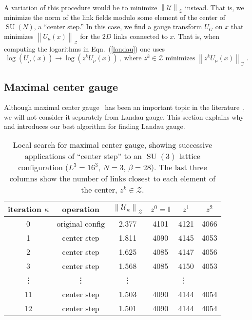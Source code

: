 \documentclass[preprint,aps,prd]{revtex4-2}
\newcommand{\be}{\begin{equation}}
\newcommand{\eq}{\end{equation}}
\newcommand{\zentrum}{\mathcal{Z}}       %
\newcommand{\config}{\mathcal{U}}
\DeclareMathOperator{\SU}{SU}
\newcommand\fnorm[1]{\left\lVert #1 \right\rVert_\mathrm{F}}
\newcommand\znorm[1]{\left\lVert #1 \right\rVert_\zentrum}
\begin{document}
A variation of this procedure would be to minimize
$\znorm{\config}$ instead.
That is, we minimize the norm of the link
fields modulo some element of the center of $\SU(N)$, a ``center step.''
In this case, we find a gauge transform $U_G$ on $x$
that minimizes $\znorm{U_\mu(x)}$ for the $2D$
links connected to $x$.
That is, when computing the logarithms in Eqn.~(\ref{landau}) one uses
\be
\log\left(U_\mu(x)\right) \to \log\left(z^k U_\mu(x)\right)
\, , \;\mbox{
  where $z^k\in\zentrum$ minimizes}\; \fnorm{z^k U_\mu(x)} \;.
\eq


\subsection{Maximal center gauge}

Although maximal center gauge~\cite{del_debbio_center_1997}
has been an important topic in the
literature~\cite{greensite_confinement_2003},
we will not consider it separately from Landau gauge.
This section explains why and introduces our best algorithm
for finding Landau gauge.

\begin{table}
  \caption{Local search for maximal center gauge,
    showing successive applications of ``center step'' to
    an $\SU(3)$ lattice configuration ($L^3=16^3$, $N=3$, $\beta=28$).
    The last three columns show the number of links closest
    to each element of the center, $z^k \in \zentrum$.
    \label{center1}}
  \begin{tabular}{c|c|c|ccc}
    iteration $\kappa$ & operation & $\znorm{\config_\kappa}$
     & $z^0=\mathbb{I}$ & $z^1$ & $z^2$ \\
    \hline
    0 & original config & 2.377 & 4101 & 4121 & 4066\\
    1 & center step     & 1.811 & 4090 & 4145 & 4053\\
    2 & center step     & 1.625 & 4085 & 4147 & 4056\\
    3 & center step     & 1.568 & 4085 & 4150 & 4053\\
    \vdots & \vdots & \vdots & \multicolumn{3}{c}{\vdots}\\
    11 & center step    & 1.503 & 4090 & 4144 & 4054\\
    12 & center step    & 1.501 & 4090 & 4144 & 4054\\
  \end{tabular}
\end{table}
\end{document}
